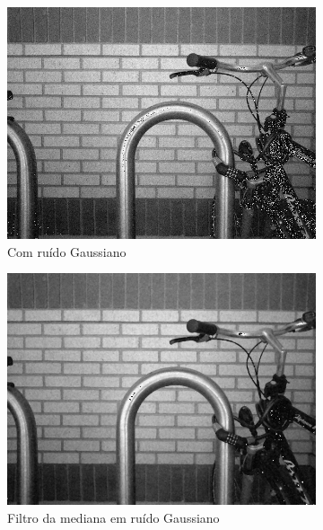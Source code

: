 \documentclass[10pt,a4paper]{article}
\begin{document}
\begin{figure}[!ht]
\begin{subfigure}[ht]{0.45\textwidth}
        \includegraphics[width=\textwidth]{ga.jpg}
        \caption{Com ruído Gaussiano}
    \end{subfigure}
    \qquad
    \begin{subfigure}[ht]{0.45\textwidth}
        \includegraphics[width=\textwidth]{ga_median.jpg}
        \caption{Filtro da mediana em ruído Gaussiano}
    \end{subfigure}
    \\
    \begin{subfigure}[ht]{0.45\textwidth}

\end{subfigure}
\end{figure}
\end{document}
